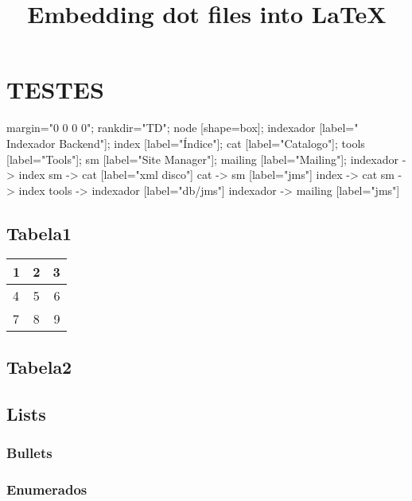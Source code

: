 \documentclass[12pt]{article}  %
\begin{document}
 

\title{\LARGE 
	Embedding dot files into \LaTeX
}
\maketitle

\tableofcontents

\section{TESTES}

{
   margin="0 0 0 0";
   rankdir="TD";
   node [shape=box];
   indexador [label=" Indexador Backend"];
   index [label="Índice"];
   cat [label="Catalogo"];
   tools [label="Tools"];
   sm [label="Site Manager"];
   mailing [label="Mailing"];   
   indexador -> index
   sm -> cat [label="xml disco"]
   cat -> sm [label="jms"]
   index -> cat
   sm -> index
   tools -> indexador [label="db/jms"]
   indexador -> mailing  [label="jms"]
}

\subsection{Tabela1}

\begin{tabular}{|  l  | c | r | }
  \hline                       
  1 & 2 & 3 \\ \hline
  4 & 5 & 6 \\ \hline
  7 & 8 & 9 \\
  \hline  
\end{tabular}

\subsection{Tabela2} 

\subsection{Lists}

\subsubsection{Bullets}

\subsubsection{Enumerados}
\end{document}
